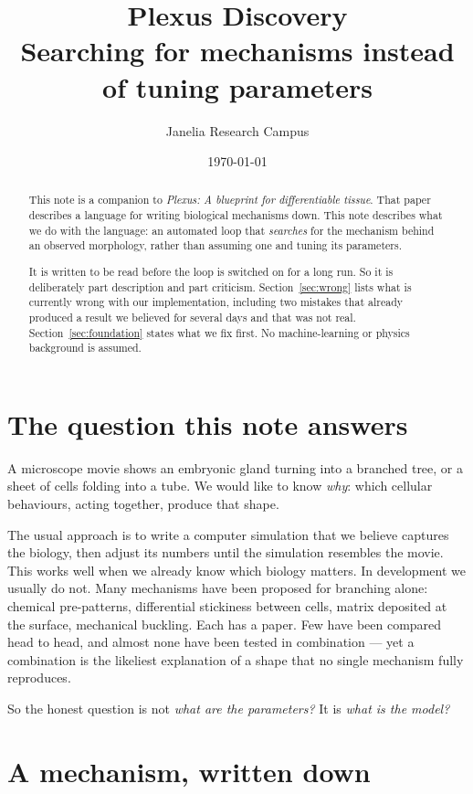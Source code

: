 \documentclass[11pt]{article}
\title{\textbf{Plexus Discovery}\\[3pt]
\large Searching for mechanisms instead of tuning parameters}
\author{Janelia Research Campus}
\date{\today}
\begin{document}
\maketitle

\begin{abstract}
\noindent
This note is a companion to \emph{Plexus: A blueprint for differentiable tissue}. That paper
describes a language for writing biological mechanisms down. This note describes what we do
with the language: an automated loop that \emph{searches} for the mechanism behind an observed
morphology, rather than assuming one and tuning its parameters.

It is written to be read before the loop is switched on for a long run. So it is deliberately
part description and part criticism. Section~\ref{sec:wrong} lists what is currently wrong with
our implementation, including two mistakes that already produced a result we believed for
several days and that was not real. Section~\ref{sec:foundation} states what we fix first.
No machine-learning or physics background is assumed.
\end{abstract}

\section{The question this note answers}

A microscope movie shows an embryonic gland turning into a branched tree, or a sheet of cells
folding into a tube. We would like to know \emph{why}: which cellular behaviours, acting
together, produce that shape.

The usual approach is to write a computer simulation that we believe captures the biology, then
adjust its numbers until the simulation resembles the movie. This works well when we already
know which biology matters. In development we usually do not. Many mechanisms have been
proposed for branching alone: chemical pre-patterns, differential stickiness between cells,
matrix deposited at the surface, mechanical buckling. Each has a paper. Few have been compared
head to head, and almost none have been tested in combination --- yet a combination is the
likeliest explanation of a shape that no single mechanism fully reproduces.

So the honest question is not \emph{what are the parameters?} It is \emph{what is the model?}

\section{A mechanism, written down}
\end{document}
